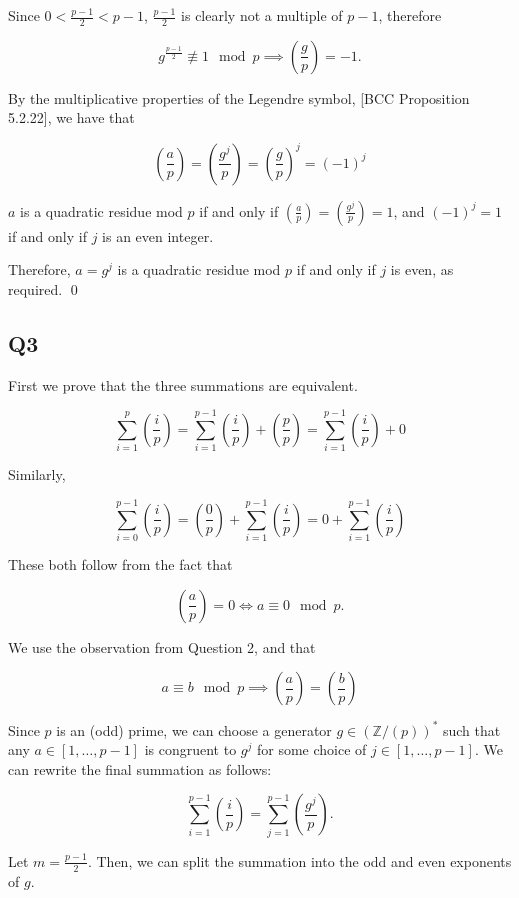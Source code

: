 \documentclass{amsart}
\begin{document}
    Since $0 < \frac{p-1}{2} < p-1$, $\frac{p-1}{2}$ is clearly not a multiple of $p - 1$, therefore

    \[g^{\frac{p-1}{2}} \not\equiv 1 \mod p \implies \left(\frac{g}{p}\right) = -1.\]

    By the multiplicative properties of the Legendre symbol, [BCC Proposition 5.2.22], we have that

    \[\left(\frac{a}{p}\right) = \left(\frac{g^j}{p}\right) = \left(\frac{g}{p}\right)^j = (-1)^j\]

    $a$ is a quadratic residue mod $p$ if and only if $\left(\frac{a}{p}\right) = \left(\frac{g^j}{p}\right) = 1$, and $(-1)^j = 1$ if and only if $j$ is an even integer. 
    
    Therefore, $a = g^j$ is a quadratic residue mod $p$ if and only if $j$ is even, as required. \qed

    \newpage

    \subsection*{Q3}

    First we prove that the three summations are equivalent.

    \[\sum_{i=1}^{p} \left(\frac{i}{p}\right) = \sum_{i=1}^{p-1} \left(\frac{i}{p}\right) + \left(\frac{p}{p}\right) = \sum_{i=1}^{p-1} \left(\frac{i}{p}\right) + 0\]

    Similarly,

    \[\sum_{i=0}^{p-1} \left(\frac{i}{p}\right) = \left(\frac{0}{p}\right) + \sum_{i=1}^{p-1} \left(\frac{i}{p}\right) = 0 + \sum_{i=1}^{p-1} \left(\frac{i}{p}\right)\]

    These both follow from the fact that

    \[\left(\frac{a}{p}\right) = 0 \iff a \equiv 0 \mod p.\]

    We use the observation from Question 2, and that 

    \[a \equiv b \mod p \implies \left(\frac{a}{p}\right) = \left(\frac{b}{p}\right)\]

    Since $p$ is an (odd) prime, we can choose a generator $g \in (\mathbb{Z}/(p))^*$ such that any $a \in [1, \dots, p-1]$ is congruent to $g^j$ for some choice of $j \in [1, \dots, p-1]$. We can rewrite the final summation as follows:

    \[\sum_{i=1}^{p-1} \left(\frac{i}{p}\right) = \sum_{j=1}^{p-1} \left(\frac{g^j}{p} \right).\]

    Let $m = \frac{p-1}{2}$. Then, we can split the summation into the odd and even exponents of $g$.
\end{document}
